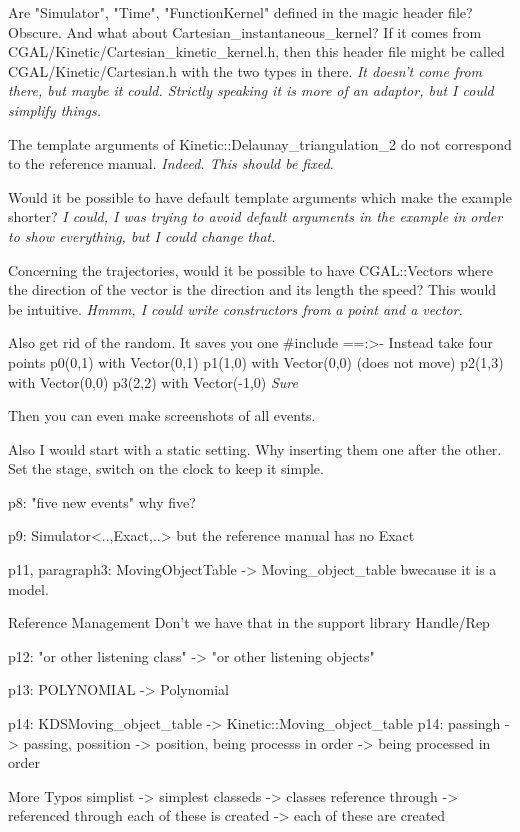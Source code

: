 Are "Simulator", "Time", "FunctionKernel" defined in the
magic header file? Obscure.
And what about Cartesian_instantaneous_kernel? If it comes
from CGAL/Kinetic/Cartesian_kinetic_kernel.h, then this
header file might be called CGAL/Kinetic/Cartesian.h
with the two types in there.
\textit{It doesn't come from there, but maybe it could. Strictly speaking it is more of an adaptor, but I could simplify things. }


The template arguments of Kinetic::Delaunay_triangulation_2
do not correspond to the reference manual.
\textit{Indeed. This should be fixed.}

Would it be possible to have default template arguments which
make the example shorter?
\textit{I could, I was trying to avoid default arguments in the example in order to show everything, but I could change that.}

Concerning the trajectories, would it be possible to have CGAL::Vectors
where the direction of the vector is the direction and its length
the speed? This would be intuitive.
\textit{Hmmm, I could write constructors from a point and a vector.}

Also get rid of the random. It saves you one #include ==:>-
Instead take four points
p0(0,1) with Vector(0,1)
p1(1,0) with Vector(0,0) (does not move)
p2(1,3) with Vector(0,0)
p3(2,2) with Vector(-1,0)
\textit{Sure}

Then you can even make screenshots of all events.

Also I would start with a static setting. Why inserting them
one after the other. Set the stage, switch on the clock
to keep it simple.


p8: "five new events" why five?

p9: Simulator<..,Exact,..>  but the reference manual has no Exact

p11, paragraph3: MovingObjectTable -> Moving_object_table bwecause it is a model.


Reference Management  Don't we have that in the support library Handle/Rep

p12: "or other listening class" -> "or other listening objects"


p13: POLYNOMIAL -> Polynomial

p14: KDSMoving_object_table -> Kinetic::Moving_object_table
p14: passingh -> passing, possition -> position, being processs in order -> being processed in order

More Typos
simplist -> simplest
classeds -> classes
reference through -> referenced through
each of these is created -> each of these are created


